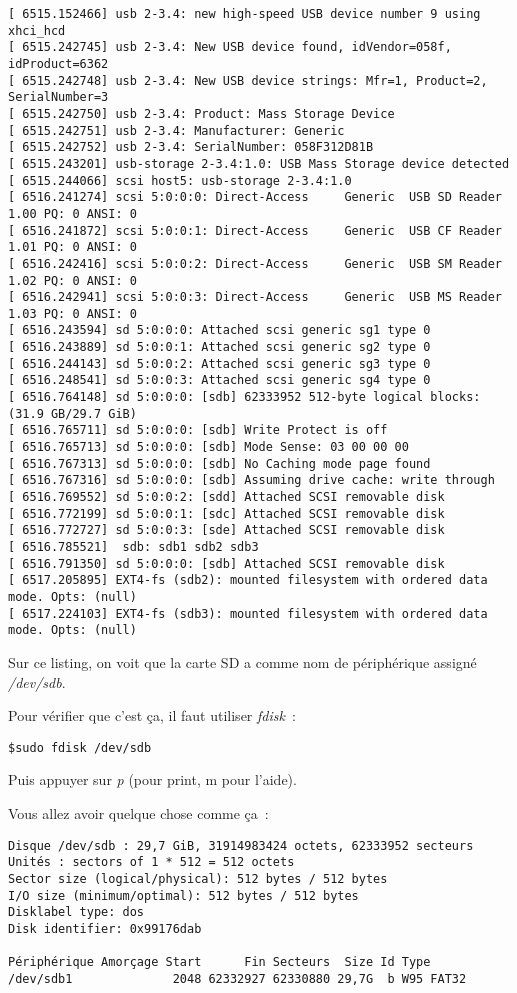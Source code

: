 \begin{verbatim}
[ 6515.152466] usb 2-3.4: new high-speed USB device number 9 using xhci_hcd
[ 6515.242745] usb 2-3.4: New USB device found, idVendor=058f, idProduct=6362
[ 6515.242748] usb 2-3.4: New USB device strings: Mfr=1, Product=2, SerialNumber=3
[ 6515.242750] usb 2-3.4: Product: Mass Storage Device
[ 6515.242751] usb 2-3.4: Manufacturer: Generic
[ 6515.242752] usb 2-3.4: SerialNumber: 058F312D81B
[ 6515.243201] usb-storage 2-3.4:1.0: USB Mass Storage device detected
[ 6515.244066] scsi host5: usb-storage 2-3.4:1.0
[ 6516.241274] scsi 5:0:0:0: Direct-Access     Generic  USB SD Reader    1.00 PQ: 0 ANSI: 0
[ 6516.241872] scsi 5:0:0:1: Direct-Access     Generic  USB CF Reader    1.01 PQ: 0 ANSI: 0
[ 6516.242416] scsi 5:0:0:2: Direct-Access     Generic  USB SM Reader    1.02 PQ: 0 ANSI: 0
[ 6516.242941] scsi 5:0:0:3: Direct-Access     Generic  USB MS Reader    1.03 PQ: 0 ANSI: 0
[ 6516.243594] sd 5:0:0:0: Attached scsi generic sg1 type 0
[ 6516.243889] sd 5:0:0:1: Attached scsi generic sg2 type 0
[ 6516.244143] sd 5:0:0:2: Attached scsi generic sg3 type 0
[ 6516.248541] sd 5:0:0:3: Attached scsi generic sg4 type 0
[ 6516.764148] sd 5:0:0:0: [sdb] 62333952 512-byte logical blocks: (31.9 GB/29.7 GiB)
[ 6516.765711] sd 5:0:0:0: [sdb] Write Protect is off
[ 6516.765713] sd 5:0:0:0: [sdb] Mode Sense: 03 00 00 00
[ 6516.767313] sd 5:0:0:0: [sdb] No Caching mode page found
[ 6516.767316] sd 5:0:0:0: [sdb] Assuming drive cache: write through
[ 6516.769552] sd 5:0:0:2: [sdd] Attached SCSI removable disk
[ 6516.772199] sd 5:0:0:1: [sdc] Attached SCSI removable disk
[ 6516.772727] sd 5:0:0:3: [sde] Attached SCSI removable disk
[ 6516.785521]  sdb: sdb1 sdb2 sdb3
[ 6516.791350] sd 5:0:0:0: [sdb] Attached SCSI removable disk
[ 6517.205895] EXT4-fs (sdb2): mounted filesystem with ordered data mode. Opts: (null)
[ 6517.224103] EXT4-fs (sdb3): mounted filesystem with ordered data mode. Opts: (null)
\end{verbatim}

Sur ce listing, on voit que la carte SD a comme nom de périphérique assigné \emph{/dev/sdb}.

Pour vérifier que c'est ça, il faut utiliser \emph{fdisk}~:
\begin{verbatim}
$sudo fdisk /dev/sdb
\end{verbatim}

Puis appuyer sur \emph{p} (pour print, m pour l'aide).

Vous allez avoir quelque chose comme ça~:
\begin{verbatim}
Disque /dev/sdb : 29,7 GiB, 31914983424 octets, 62333952 secteurs
Unités : sectors of 1 * 512 = 512 octets
Sector size (logical/physical): 512 bytes / 512 bytes
I/O size (minimum/optimal): 512 bytes / 512 bytes
Disklabel type: dos
Disk identifier: 0x99176dab

Périphérique Amorçage Start      Fin Secteurs  Size Id Type
/dev/sdb1              2048 62332927 62330880 29,7G  b W95 FAT32
\end{verbatim}

